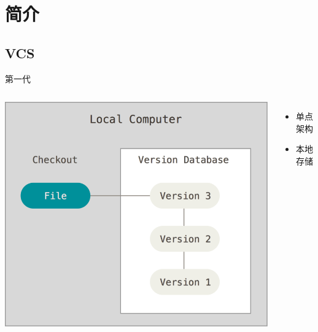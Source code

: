 \section{简介}

\subsection{VCS}

\begin{frame}{第一代}
    \begin{columns}[onlytextwidth]
        \centering
        \includegraphics[scale=0.24]{figures/local.png}\\
        \begin{itemize}
            \item 单点架构
            \item 本地存储
        \end{itemize}
    \end{columns}
\end{frame}

